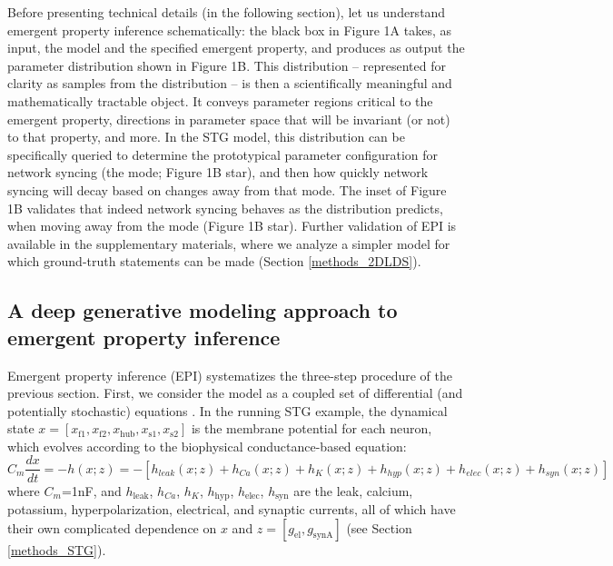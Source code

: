 \documentclass[11pt]{article}
\begin{document}
Before presenting technical details (in the following section), let us understand emergent property inference schematically:  the black box in Figure 1A takes, as input, the model and the specified emergent property, and produces as output the parameter distribution shown in Figure 1B.  
This distribution -- represented for clarity as samples from the distribution -- is then a scientifically meaningful and mathematically tractable object.  
It conveys parameter regions critical to the emergent property, directions in parameter space that will be invariant (or not) to that property, and more.  
In the STG model, this distribution can be specifically queried to determine the prototypical parameter configuration for network syncing (the mode; Figure 1B star), and then how quickly network syncing will decay based on changes away from that mode.  The inset of Figure 1B validates that indeed network syncing behaves as the distribution predicts, when moving away from the mode (Figure 1B star).  
Further validation of EPI is available in the supplementary materials, where we analyze a simpler model for which ground-truth statements can be made (Section \ref{methods_2DLDS}).

\subsection{A deep generative modeling approach to emergent property inference} \label{results_dgm}

Emergent property inference (EPI) systematizes the three-step procedure of the previous section.
First, we consider the model as a coupled set of differential (and potentially stochastic) equations \cite{gutierrez2013multiple}.  In the running STG example, the dynamical state $x = \left[ x_{\text{f1}}, x_{\text{f2}}, x_{\text{hub}}, x_{\text{s1}}, x_{\text{s2}} \right]$ is the membrane potential for each neuron, which evolves according to the biophysical conductance-based equation:
\begin{equation} C_m \frac{dx}{dt} = -h(x; z) = - \left[ h_{leak}(x; z) + h_{Ca}(x; z) + h_K(x; z) + h_{hyp}(x; z) + h_{elec}(x; z) + h_{syn}(x; z)\right] 
\end{equation} 
where $C_m$=1nF, and $h_{\text{leak}}$, $h_{Ca}$, $h_K$, $h_{\text{hyp}}$, $h_{\text{elec}}$, $h_{\text{syn}}$ are the leak, calcium, potassium, hyperpolarization, electrical, and synaptic currents, all of which have their own complicated dependence on $x$ and $z = [g_{\text{el}}, g_{\text{synA}}]$ (see Section \ref{methods_STG}).
\end{document}
